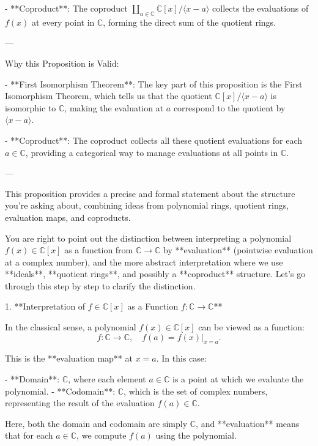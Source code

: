\documentclass[11pt,openany]{article}
\begin{document}
- **Coproduct**: The coproduct \( \coprod_{a \in \mathbb{C}} \mathbb{C}[x] / \langle x - a \rangle \) collects the evaluations of \( f(x) \) at every point in \( \mathbb{C} \), forming the direct sum of the quotient rings.

---

Why this Proposition is Valid:

- **First Isomorphism Theorem**: The key part of this proposition is the First Isomorphism Theorem, which tells us that the quotient \( \mathbb{C}[x] / \langle x - a \rangle \) is isomorphic to \( \mathbb{C} \), making the evaluation at \( a \) correspond to the quotient by \( \langle x - a \rangle \).

- **Coproduct**: The coproduct collects all these quotient evaluations for each \( a \in \mathbb{C} \), providing a categorical way to manage evaluations at all points in \( \mathbb{C} \).

---

This proposition provides a precise and formal statement about the structure you're asking about, combining ideas from polynomial rings, quotient rings, evaluation maps, and coproducts.

\newpage

You are right to point out the distinction between interpreting a polynomial \( f(x) \in \mathbb{C}[x] \) as a function from \( \mathbb{C} \to \mathbb{C} \) by **evaluation** (pointwise evaluation at a complex number), and the more abstract interpretation where we use **ideals**, **quotient rings**, and possibly a **coproduct** structure. Let's go through this step by step to clarify the distinction.

1. **Interpretation of \( f \in \mathbb{C}[x] \) as a Function \( f: \mathbb{C} \to \mathbb{C} \)**

In the classical sense, a polynomial \( f(x) \in \mathbb{C}[x] \) can be viewed as a function:
\[
f: \mathbb{C} \to \mathbb{C}, \quad f(a) = f(x)\big|_{x=a}.
\]

This is the **evaluation map** at \( x = a \). In this case:

- **Domain**: \( \mathbb{C} \), where each element \( a \in \mathbb{C} \) is a point at which we evaluate the polynomial.
- **Codomain**: \( \mathbb{C} \), which is the set of complex numbers, representing the result of the evaluation \( f(a) \in \mathbb{C} \).

Here, both the domain and codomain are simply \( \mathbb{C} \), and **evaluation** means that for each \( a \in \mathbb{C} \), we compute \( f(a) \) using the polynomial.
\end{document}
